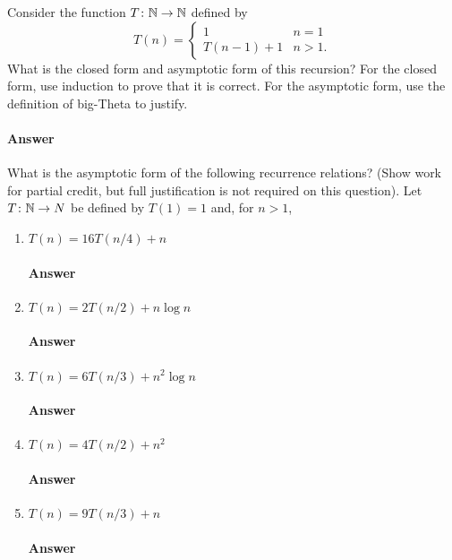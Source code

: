 \documentclass{article}
\begin{document}
\collab{\todo{}}
Consider the function $T \colon {\mathbb N} \to {\mathbb N}$ defined by
$$T(n) = \begin{cases}
		1        & n=1  \\
		T(n-1)+1 & n>1.
	\end{cases}
$$
What is the closed form and asymptotic form of this recursion?  For the
closed form, use induction to prove that it is correct.  For the asymptotic
form, use the definition of big-Theta to justify.

\paragraph{Answer}
\todo{}


\collab{\todo{}}

What is the asymptotic form of the following recurrence
relations? (Show work for partial credit, but full justification is not required
on this question).
Let $T \colon {\mathbb N} \to N$ be defined by $T(1)=1$ and, for $n>1$,
\begin{enumerate}
	\item $T(n) = 16 T(n/4) + n$
	      \paragraph{Answer} \todo{}
	\item $T(n) = 2 T(n/2) + n \log{n}$
	      \paragraph{Answer} \todo{}
	\item $T(n) = 6 T(n/3) + n^2 \log{n}$
	      \paragraph{Answer} \todo{}
	\item $T(n) = 4 T(n/2) + n^2$
	      \paragraph{Answer} \todo{}
	\item $T(n) = 9 T(n/3) + n$
	      \paragraph{Answer} \todo{}
\end{enumerate}
\end{document}
